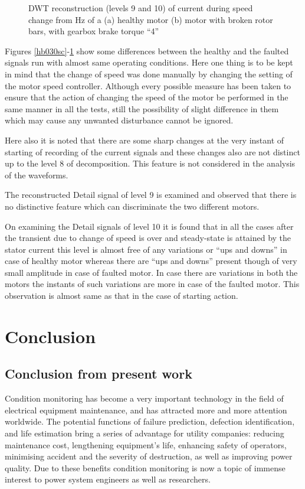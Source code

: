 \documentclass[a4paper,11pt]{report}
\begin{document}
\begin{figure}[h]
\centering
\subfigure[]{\texttt{[image: h450sc]}}
\subfigure[]{\texttt{[image: b450sc]}}
\caption{DWT reconstruction (levels 9 and 10) of current during speed change from \unit[50]{Hz} of a (a) healthy motor (b) motor with broken rotor bars, with gearbox brake torque ``4''} \label{hb450sc}
\end{figure}

\clearpage
Figures \ref{hb030sc}-\ref{hb450sc} show some differences between the healthy and the faulted signals run with almost same operating conditions. Here one thing is to be kept in mind that the change of speed was done manually by changing the setting of the motor speed controller. Although every possible measure has been taken to ensure that the action of changing the speed of the motor be performed in the same manner in all the tests, still the possibility of slight difference in them which may cause any unwanted disturbance cannot be ignored. 

Here also it is noted that there are some sharp changes at the very instant of starting of recording of the current signals and these changes also are not distinct up to the level 8 of decomposition. This feature is not considered in the analysis of the waveforms.

The reconstructed Detail signal of level 9 is examined and observed that there is no distinctive feature which can discriminate the two different motors. 

On examining the Detail signals of level 10 it is found that in all the cases after the transient due to change of speed is over and steady-state is attained by the stator current this level is almost free of any variations or ``ups and downs'' in case of healthy motor whereas there are ``ups and downs'' present though of very small amplitude in case of faulted motor. In case there are variations in both the motors the instants of such variations are more in case of the faulted motor. This observation is almost same as that in the case of starting action.

\chapter{Conclusion}
\section{Conclusion from present work}
Condition monitoring has become a very important technology in the field of electrical equipment maintenance, and has attracted more and more attention worldwide. The potential functions of failure prediction, defection identification, and life estimation bring a series of advantage for utility companies: reducing maintenance cost, lengthening equipment's life, enhancing safety of operators, minimising accident and the severity of destruction, as well as improving power quality. Due to these benefits condition monitoring is now a topic of immense interest to power system engineers as well as researchers.
\end{document}

